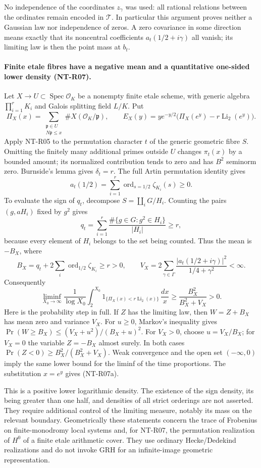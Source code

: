 No independence of the coordinates $z_\gamma$ was used: all rational
relations between the ordinates remain encoded in $\mathcal T$.
In particular this argument proves neither a Gaussian law nor
independence of zeros. A zero covariance in some direction means
exactly that its noncentral coefficients $a_t(1/2+i\gamma)$ all
vanish; its limiting law is then the point mass at $b_t$.

\paragraph{Finite etale fibres have a negative mean and a quantitative
one-sided lower density (NT-R07).}
Let $X\to U\subset\operatorname{Spec}\mathcal O_K$ be a nonempty
finite etale scheme, with generic algebra $\prod_{i=1}^r K_i$ and
Galois splitting field $L/K$. Put
\[
 \Pi_X(x)=\sum_{\substack{\mathfrak p\in U\\N\mathfrak p\le x}}
                         \#X(\mathcal O_K/\mathfrak p),\qquad
 E_X(y)=ye^{-y/2}\bigl(\Pi_X(e^y)-r\operatorname{Li}_2(e^y)\bigr).
\]
Apply NT-R05 to the permutation character $t$ of the generic
geometric fibre $S$. Omitting the finitely many additional primes
outside $U$ changes $\pi_t(x)$ by a bounded amount; its normalized
contribution tends to zero and has $B^2$ seminorm zero. Burnside's
lemma gives $\delta_t=r$. The full Artin permutation identity gives
\[
 a_t(1/2)=\sum_{i=1}^r\operatorname{ord}_{s=1/2}\zeta_{K_i}(s)
       \ge0.
\]
To evaluate the sign of $q_t$, decompose $S=\coprod_iG/H_i$.
Counting the pairs $(g,aH_i)$ fixed by $g^2$ gives
\[
 q_t=\sum_{i=1}^r
      \frac{\#\{g\in G:g^2\in H_i\}}{|H_i|}\ge r,
\]
because every element of $H_i$ belongs to the set being counted.
Thus the mean is $-B_X$, where
\[
 B_X=q_t+2\sum_i\operatorname{ord}_{1/2}\zeta_{K_i}\ge r>0,
 \qquad
 V_X=2\sum_{\gamma\in\Gamma}
          \frac{|a_t(1/2+i\gamma)|^2}{1/4+\gamma^2}<\infty.
\]
Consequently
\[
 \liminf_{X_0\to\infty}\frac1{\log X_0}
 \int_2^{X_0}
 1_{\{\Pi_X(x)<r\operatorname{Li}_2(x)\}}\,\frac{dx}{x}
       \ge\frac{B_X^2}{B_X^2+V_X}>0.
 \tag{NT-R07a}
\]
Here is the probability step in full. If $Z$ has the limiting law,
then $W=Z+B_X$ has mean zero and variance $V_X$. For $u\ge0$,
Markov's inequality gives
$\Pr(W\ge B_X)\le(V_X+u^2)/(B_X+u)^2$.
For $V_X>0$, choose $u=V_X/B_X$; for $V_X=0$ the variable
$Z=-B_X$ almost surely. In both cases
$\Pr(Z<0)\ge B_X^2/(B_X^2+V_X)$.
Weak convergence and the open set $(-\infty,0)$ imply the same
lower bound for the liminf of the time proportions. The substitution
$x=e^y$ gives (NT-R07a).

This is a positive lower logarithmic density. The existence of the
sign density, its being greater than one half, and densities of all
strict orderings are not asserted. They require additional control
of the limiting measure, notably its mass on the relevant boundary.
Geometrically these statements concern the trace of Frobenius on
finite-monodromy local systems and, for NT-R07, the permutation
realization of $H^0$ of a finite etale arithmetic cover. They use
ordinary Hecke/Dedekind realizations and do not invoke GRH for an
infinite-image geometric representation.
